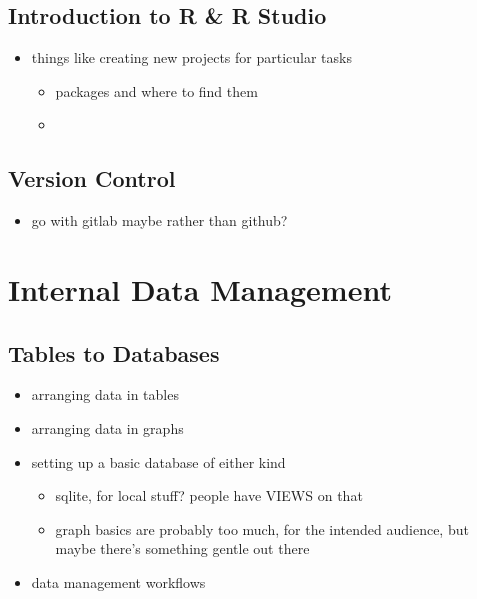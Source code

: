 \documentclass[
]{book}
\providecommand{\tightlist}{%
  \setlength{\itemsep}{0pt}\setlength{\parskip}{0pt}}
\begin{document}
\hypertarget{introduction-to-r-r-studio}{%
\section{Introduction to R \& R Studio}\label{introduction-to-r-r-studio}}

\begin{itemize}
\tightlist
\item
  things like creating new projects for particular tasks

  \begin{itemize}
  \tightlist
  \item
    packages and where to find them
  \item
  \end{itemize}
\end{itemize}

\hypertarget{version-control}{%
\section{Version Control}\label{version-control}}

\begin{itemize}
\tightlist
\item
  go with gitlab maybe rather than github?
\end{itemize}

\hypertarget{tutorials}{%
\chapter{Internal Data Management}\label{tutorials}}

\hypertarget{data-management}{%
\section{Tables to Databases}\label{data-management}}

\begin{itemize}
\tightlist
\item
  arranging data in tables
\item
  arranging data in graphs
\item
  setting up a basic database of either kind

  \begin{itemize}
  \tightlist
  \item
    sqlite, for local stuff? people have VIEWS on that
  \item
    graph basics are probably too much, for the intended audience, but maybe there's something gentle out there
  \end{itemize}
\item
  data management workflows
\end{itemize}
\end{document}
